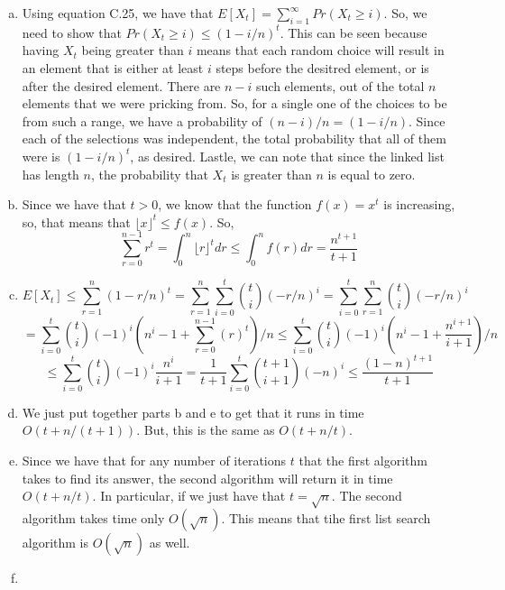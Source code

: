 \documentclass{article}
\begin{document}
{\begin{enumerate}[a.]
\item

Using equation C.25, we have that $E[X_t] = \sum_{i=1}^{\infty} Pr(X_t\ge i)$. So, we need to show that $ Pr(X_t\ge i) \le (1-i/n)^t$. This can be seen because having $X_t$ being greater than $i$ means that each random choice will result in an element that is either at least $i$ steps before the desitred element, or is after the desired element. There are $n-i$ such elements, out of the total $n$ elements that we were pricking from. So, for a single one of the choices to be from such a range, we have a probability of $(n-i)/n = (1-i/n)$. Since each of the selections was independent, the total probability that all of them were is $(1-i/n)^t$, as desired. Lastle, we can note that since the linked list has length $n$, the probability that $X_t$ is greater than $n$ is equal to zero.

\item

Since we have that $t>0$, we know that the function $f(x) = x^t$ is increasing, so, that means that $\lfloor x \rfloor ^t \le f(x)$. So,
\[
\sum_{r=0}^{n-1} r^t  = \int_{0}^n \lfloor r \rfloor^t dr \le \int_0^n f(r) dr = \frac{n^{t+1}}{t+1}
\]

\item

\[
E[X_t] \le \sum_{r=1}^n (1-r/n)^t = \sum_{r=1}^n \sum_{i=0}^t \binom{t}{i} (-r/n)^i = \sum_{i=0}^t \sum_{r=1}^n  \binom{t}{i} (-r/n)^i \]\[
= \sum_{i=0}^t  \binom{t}{i} (-1)^i\left(n^i -1+ \sum_{r=0}^{n-1} (r)^t\right)/n \le \sum_{i=0}^t  \binom{t}{i} (-1)^i\left( n^i-1+ \frac{n^{i+1}}{i+1}\right)/n 
\]
\[
\le  \sum_{i=0}^t  \binom{t}{i} (-1)^i \frac{n^i}{i+1} =  \frac{1}{t+1} \sum_{i=0}^t \binom{t+1}{i+1} (-n)^i \le \frac{(1-n)^{t+1}}{t+1}
\]

\item

We just put together parts b and e to get that it runs in time $O(t+n/(t+1))$. But, this is the same as $O(t+n/t)$.

\item

Since we have that for any number of iterations $t$ that the first algorithm takes to find its answer, the second algorithm will return it in time $O(t+ n/t)$. In particular, if we just have that $t = \sqrt{n}$. The second algorithm takes time only $O(\sqrt{n})$. This means that tihe first list search algorithm is $O(\sqrt{n})$ as well.

\item


\end{enumerate}}
\end{document}
